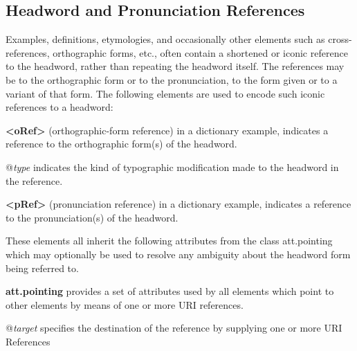 \subsection[{Headword and Pronunciation References}]{Headword and Pronunciation References}\label{DIHW}\par
Examples, definitions, etymologies, and occasionally other elements such as cross-references, orthographic forms, etc., often contain a shortened or iconic reference to the headword, rather than repeating the headword itself. The references may be to the orthographic form or to the pronunciation, to the form given or to a variant of that form. The following elements are used to encode such iconic references to a headword:
\begin{sansreflist}
  
\item [\textbf{<oRef>}] (orthographic-form reference) in a dictionary example, indicates a reference to the orthographic form(s) of the headword.\hfil\\[-10pt]\begin{sansreflist}
    \item[@{\itshape type}]
  indicates the kind of typographic modification made to the headword in the reference.
\end{sansreflist}  
\item [\textbf{<pRef>}] (pronunciation reference) in a dictionary example, indicates a reference to the pronunciation(s) of the headword.
\end{sansreflist}
\par
These elements all inherit the following attributes from the class \textsf{att.pointing} which may optionally be used to resolve any ambiguity about the headword form being referred to.
\begin{sansreflist}
  
\item [\textbf{att.pointing}] provides a set of attributes used by all elements which point to other elements by means of one or more URI references.\hfil\\[-10pt]\begin{sansreflist}
    \item[@{\itshape target}]
  specifies the destination of the reference by supplying one or more URI References
\end{sansreflist}  
\end{sansreflist}
\par
